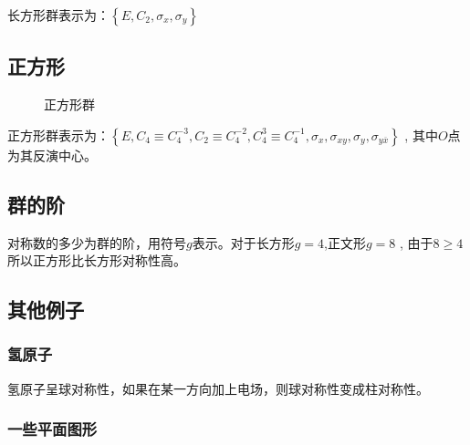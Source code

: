 \documentclass[math=mtpro2,lang=cn,color=green]{elegantbook}
\begin{document}
\begin{note}
长方形群表示为：$\left\{ E , C_2, \sigma_x, \sigma_y  \right\}$ 
\end{note}

\subsection{正方形}

\begin{figure}[H]
   \centering
   \caption{正方形群}
   \label{fig:group2}
\end{figure}

\begin{note}
正方形群表示为：$\left\{ E,C_4\equiv C_4^{-3}, C_2\equiv C_4^{-2}, C_4^3\equiv C_4^{-1},\sigma_x,\sigma_{xy},\sigma_y, \sigma_{y\overline{x}} \right\}$
, 其中$O$点为其反演中心。
\end{note}


\subsection{群的阶}

对称数的多少为群的阶，用符号$g$表示。对于长方形$g=4$,正文形$g=8$ , 由于$8\geq 4$ 所以正方形比长方形对称性高。


\subsection{其他例子}

\subsubsection{氢原子}

氢原子呈球对称性，如果在某一方向加上电场，则球对称性变成柱对称性。

\subsubsection{一些平面图形}
\end{document}
